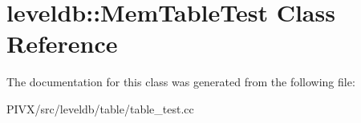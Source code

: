 \hypertarget{classleveldb_1_1_mem_table_test}{}\section{leveldb\+:\+:Mem\+Table\+Test Class Reference}
\label{classleveldb_1_1_mem_table_test}


The documentation for this class was generated from the following file\+:\begin{DoxyCompactItemize}
\item 
P\+I\+V\+X/src/leveldb/table/table\+\_\+test.\+cc\end{DoxyCompactItemize}
